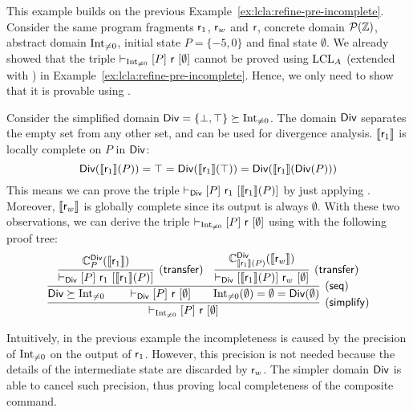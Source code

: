 \begin{example}\label{ex:lcla:simplify-stronger}
	This example builds on the previous Example~\ref{ex:lcla:refine-pre-incomplete}.
	Consider the same program fragments $\mathsf{r}_1$, $\mathsf{r}_w$ and $\mathsf{r}$, concrete domain $\mathcal{P}(\mathbb{Z})$, abstract domain $\text{Int}_{\neq 0}$, initial state $P = \{ -5, 0 \}$ and final state $\emptyset$.
	We already showed that the triple $\vdash_{\text{Int}_{\neq 0}}\nobreak[P]~\mathsf{r}~[\emptyset]$ cannot be proved using $\text{LCL}_A$ (extended with ) in Example~\ref{ex:lcla:refine-pre-incomplete}. Hence, we only need to show that it is provable using .

	Consider the simplified domain $\mathsf{Div} = \{ \bot, \top \} \succeq \text{Int}_{\neq 0}$.
	The domain $\mathsf{Div}$ separates the empty set from any other set, and can be used for divergence analysis.
	$\llbracket\mathsf{r}_1\rrbracket$ is locally complete on $P$ in $\mathsf{Div}$:
	\begin{equation*}
		\mathsf{Div}(\llbracket\mathsf{r}_1\rrbracket(P)) = \top = \mathsf{Div}(\llbracket\mathsf{r}_1\rrbracket(\top)) = \mathsf{Div}(\llbracket\mathsf{r}_1\rrbracket(\mathsf{Div}(P)))
	\end{equation*}
	This means we can prove the triple $\vdash_{\mathsf{Div}}\nobreak[P]~\mathsf{r}_1~[ \llbracket\mathsf{r}_1\rrbracket(P) ]$ by just applying . Moreover, $\llbracket\mathsf{r}_w\rrbracket$ is globally complete since its output is always $\emptyset$. With these two observations, we can derive the triple $\vdash_{\text{Int}_{\neq 0}}\nobreak[P]~\mathsf{r}~[\emptyset]$ using  with the following proof tree:
	\[
	\infer[(\mathsf{simplify})]
	{ \lcl{\Int_{\neq 0}}{P}{\regr}{\emptyset} }
	{
		\infer[(\mathsf{seq})]
		{
			\Div \succeq \Int_{\neq 0}
			\qquad \lcl{\Div}{P}{\regr}{\emptyset}
			\qquad \Int_{\neq 0}(\emptyset) = \emptyset = \Div(\emptyset)
		}
		{
			\infer[(\mathsf{transfer})]
			{ \lcl{\Div}{P}{\regr_1}{\denot{\regr_1}(P)} }
			{ \complete{\Div}{P}{\denot{\regr_1}} }
			&
			\infer[(\mathsf{transfer})]
			{ \lcl{\Div}{\denot{\regr_1}(P)}{\regr_w}{\emptyset} }
			{ \complete{\Div}{\denot{\regr_1}(P)}{\denot{\regr_w}} }
		}
	}
	\]
\end{example}

Intuitively, in the previous example the incompleteness is caused by the precision of $\text{Int}_{\neq 0}$ on the output of $\mathsf{r}_1$. However, this precision is not needed because the details of the intermediate state are discarded by $\mathsf{r}_w$. The simpler domain $\mathsf{Div}$ is able to cancel such precision, thus proving local completeness of the composite command.

